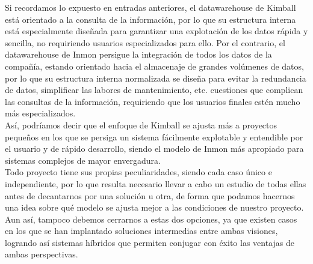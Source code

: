 \documentclass[twoside,twocolumn]{article}
\begin{document}
\begin{enumerate}
\begin{itemize}
Si recordamos lo expuesto en entradas anteriores, el datawarehouse de Kimball está orientado a la consulta de la información, por lo que su estructura interna está especialmente diseñada para garantizar una explotación de los datos rápida y sencilla, no requiriendo usuarios especializados para ello. Por el contrario, el datawarehouse de Inmon persigue la integración de todos los datos de la compañía, estando orientado hacia el almacenaje de grandes volúmenes de datos, por lo que su estructura interna normalizada se diseña para evitar la redundancia de datos, simplificar las labores de mantenimiento, etc. cuestiones que complican las consultas de la información, requiriendo que los usuarios finales estén mucho más especializados. \\
Así, podríamos decir que el enfoque de Kimball se ajusta más a proyectos pequeños en los que se persiga un sistema fácilmente explotable y entendible por el usuario y de rápido desarrollo, siendo el modelo de Inmon más apropiado para sistemas complejos de mayor envergadura. \\
Todo proyecto tiene sus propias peculiaridades, siendo cada caso único e independiente, por lo que resulta necesario llevar a cabo un estudio de todas ellas antes de decantarnos por una solución u otra, de forma que podamos hacernos una idea sobre qué modelo se ajusta mejor a las condiciones de nuestro proyecto. \\
Aun así, tampoco debemos cerrarnos a estas dos opciones, ya que existen casos en los que se han implantado soluciones intermedias entre ambas visiones, logrando así sistemas híbridos que permiten conjugar con éxito las ventajas de ambas perspectivas. \\

\end{itemize}


	
\end{enumerate}







\end{document}
